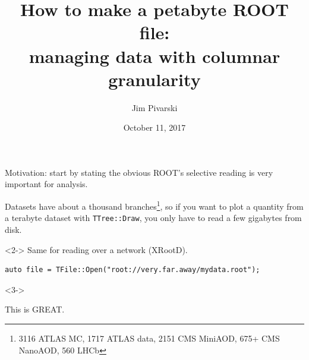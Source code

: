 \documentclass[aspectratio=169]{beamer}
\title[2017-10-11-rootioworkshop-petabyte-file]{How to make a petabyte ROOT file: \\ managing data with columnar granularity}
\author{Jim Pivarski}
\institute{Princeton University -- DIANA}
\date{October 11, 2017}
\begin{document}

\begin{frame}
  \titlepage
\end{frame}




\begin{frame}[fragile]{Motivation: start by stating the obvious}
\vspace{0.15 cm}
ROOT's selective reading is very important for analysis.

\vspace{0.25 cm}
Datasets have about a thousand branches\footnote{3116 ATLAS MC, 1717 ATLAS data, 2151 CMS MiniAOD, 675+ CMS NanoAOD, 560 LHCb}, so if you want to plot a quantity from a terabyte dataset with {\tt TTree::Draw}, you only have to read a few gigabytes from disk.

\begin{uncoverenv}<2->
\vspace{1 cm}
Same for reading over a network (XRootD).
\begin{verbatim}
auto file = TFile::Open("root://very.far.away/mydata.root");
\end{verbatim}
\end{uncoverenv}

\vspace{0.1 cm}
\begin{uncoverenv}<3->
\begin{center}
\LARGE This is GREAT.
\end{center}
\end{uncoverenv}
\end{frame}
\end{document}
